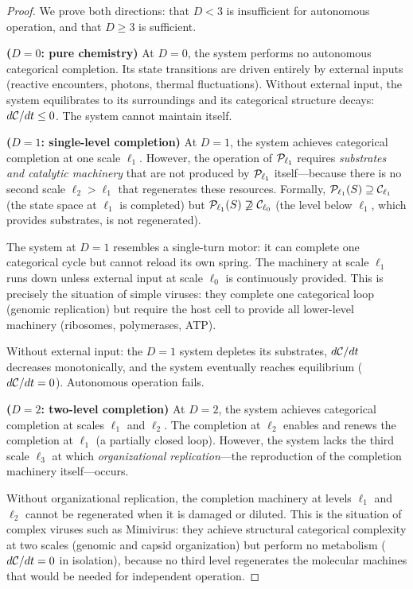 \begin{proof}
We prove both directions: that $D < 3$ is insufficient for autonomous operation,
and that $D \geq 3$ is sufficient.

\medskip
\noindent\textbf{($D = 0$: pure chemistry)}
At $D = 0$, the system performs no autonomous categorical completion. Its state
transitions are driven entirely by external inputs (reactive encounters,
photons, thermal fluctuations). Without external input, the system equilibrates
to its surroundings and its categorical structure decays: $d\mathcal{C}/dt \leq 0$.
The system cannot maintain itself.

\medskip
\noindent\textbf{($D = 1$: single-level completion)}
At $D = 1$, the system achieves categorical completion at one scale $\ell_1$.
However, the operation of $\mathcal{P}_{\ell_1}$ requires \emph{substrates and
catalytic machinery} that are not produced by $\mathcal{P}_{\ell_1}$ itself---because
there is no second scale $\ell_2 > \ell_1$ that regenerates these resources.
Formally, $\mathcal{P}_{\ell_1}(S) \supseteq \mathcal{C}_{\ell_1}$ (the state space at
$\ell_1$ is completed) but $\mathcal{P}_{\ell_1}(S) \not\supseteq \mathcal{C}_{\ell_0}$
(the level below $\ell_1$, which provides substrates, is not regenerated).

The system at $D = 1$ resembles a single-turn motor: it can complete one
categorical cycle but cannot reload its own spring. The machinery at scale
$\ell_1$ runs down unless external input at scale $\ell_0$ is continuously
provided. This is precisely the situation of simple viruses: they complete one
categorical loop (genomic replication) but require the host cell to provide
all lower-level machinery (ribosomes, polymerases, ATP).

Without external input: the $D=1$ system depletes its substrates, $d\mathcal{C}/dt$
decreases monotonically, and the system eventually reaches equilibrium
($d\mathcal{C}/dt = 0$). Autonomous operation fails.

\medskip
\noindent\textbf{($D = 2$: two-level completion)}
At $D = 2$, the system achieves categorical completion at scales $\ell_1$ and
$\ell_2$. The completion at $\ell_2$ enables and renews the completion at
$\ell_1$ (a partially closed loop). However, the system lacks the third scale
$\ell_3$ at which \emph{organizational replication}---the reproduction of the
completion machinery itself---occurs.

Without organizational replication, the completion machinery at levels $\ell_1$
and $\ell_2$ cannot be regenerated when it is damaged or diluted. This is the
situation of complex viruses such as Mimivirus: they achieve structural
categorical complexity at two scales (genomic and capsid organization) but
perform no metabolism ($d\mathcal{C}/dt = 0$ in isolation), because no third level
regenerates the molecular machines that would be needed for independent operation.


\end{proof}
